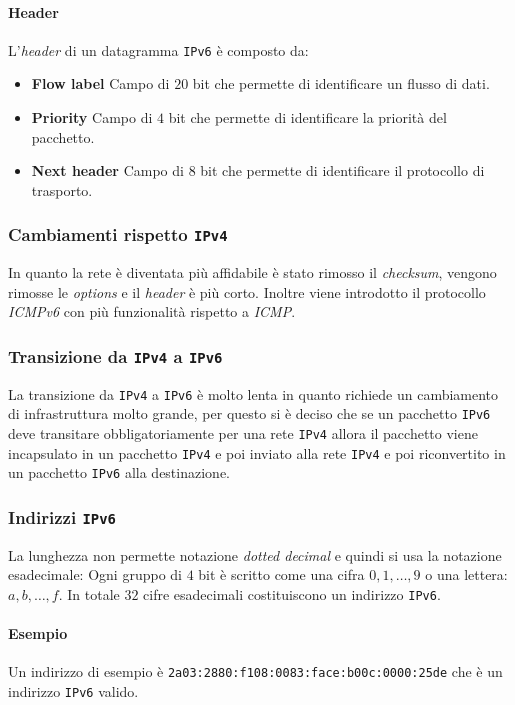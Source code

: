             \paragraph{Header} L'\textit{header} di un datagramma \texttt{IPv6} è composto da: \begin{itemize}
                \item \textbf{Flow label} Campo di $20$ bit che permette di identificare un flusso di dati.
                \item \textbf{Priority} Campo di $4$ bit che permette di identificare la priorità del pacchetto.
                \item \textbf{Next header} Campo di $8$ bit che permette di identificare il protocollo di trasporto.
            \end{itemize}
        \subsubsection{Cambiamenti rispetto \texttt{IPv4}}
            In quanto la rete è diventata più affidabile è stato rimosso il \textit{checksum}, vengono rimosse le \textit{options} e il \textit{header} è più corto. Inoltre viene introdotto il protocollo \textit{ICMPv6} con più funzionalità rispetto a \textit{ICMP}.
        \subsubsection{Transizione da \texttt{IPv4} a \texttt{IPv6}}
            La transizione da \texttt{IPv4} a \texttt{IPv6} è molto lenta in quanto richiede un cambiamento di infrastruttura molto grande, per questo si è deciso che se un pacchetto \texttt{IPv6} deve transitare obbligatoriamente per una rete \texttt{IPv4} allora il pacchetto viene incapsulato in un pacchetto \texttt{IPv4} e poi inviato alla rete \texttt{IPv4} e poi riconvertito in un pacchetto \texttt{IPv6} alla destinazione.
        \subsubsection{Indirizzi \texttt{IPv6}}
            La lunghezza non permette notazione \textit{dotted decimal} e quindi si usa la notazione esadecimale: Ogni gruppo di $4$ bit è scritto come una cifra $0,1,\dots,9$ o una lettera: $a,b,\dots,f$. In totale $32$ cifre esadecimali costituiscono un indirizzo \texttt{IPv6}.
            \paragraph{Esempio} Un indirizzo di esempio è \texttt{2a03:2880:f108:0083:face:b00c:0000:25de} che è un indirizzo \texttt{IPv6} valido.
